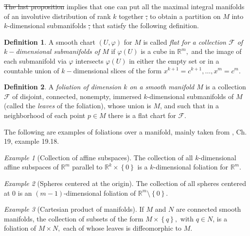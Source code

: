\documentclass[12pt, letterpaper, reqno]{amsart}
\theoremstyle{definition}
\newtheorem{df}{Definition}
\theoremstyle{plain}
\theoremstyle{remark}
\newtheorem{ex}{Example}
\providecommand{\DIFadd}[1]{{\protect\color{blue}\uwave{#1}}} %
\providecommand{\DIFdel}[1]{{\protect\color{red}\sout{#1}}}                      %
\providecommand{\DIFaddbegin}{} %
\providecommand{\DIFaddend}{} %
\providecommand{\DIFdelbegin}{} %
\providecommand{\DIFdelend}{} %
\newcommand{\DIFscaledelfig}{0.5}
\newlength{\DIFdelgraphicswidth} %
\newlength{\DIFdelgraphicsheight} %
\newcommand{\DIFaddincludegraphics}[2][]{{\color{blue}\fbox{\DIFOincludegraphics[#1]{#2}}}} %
\newcommand{\DIFdelincludegraphics}[2][]{%
\sbox{\DIFdelgraphicsbox}{\DIFOincludegraphics[#1]{#2}}%
\settoboxwidth{\DIFdelgraphicswidth}{\DIFdelgraphicsbox} %
\settoboxtotalheight{\DIFdelgraphicsheight}{\DIFdelgraphicsbox} %
\scalebox{\DIFscaledelfig}{%
\parbox[b]{\DIFdelgraphicswidth}{\usebox{\DIFdelgraphicsbox}\\[-\baselineskip] \rule{\DIFdelgraphicswidth}{0em}}\llap{\resizebox{\DIFdelgraphicswidth}{\DIFdelgraphicsheight}{%
\setlength{\unitlength}{\DIFdelgraphicswidth}%
\begin{picture}(1,1)%
\thicklines\linethickness{2pt} %
{\color[rgb]{1,0,0}\put(0,0){\framebox(1,1){}}}%
{\color[rgb]{1,0,0}\put(0,0){\line( 1,1){1}}}%
{\color[rgb]{1,0,0}\put(0,1){\line(1,-1){1}}}%
\end{picture}%
}\hspace*{3pt}}} %
} %
\DeclareRobustCommand{\DIFaddbegin}{\DIFOaddbegin \let\includegraphics\DIFaddincludegraphics} %
\DeclareRobustCommand{\DIFaddend}{\DIFOaddend \let\includegraphics\DIFOincludegraphics} %
\DeclareRobustCommand{\DIFdelbegin}{\DIFOdelbegin \let\includegraphics\DIFdelincludegraphics} %
\DeclareRobustCommand{\DIFdelend}{\DIFOaddend \let\includegraphics\DIFOincludegraphics} %
\begin{document}
\DIFdelbegin \DIFdel{The last proposition }\DIFdelend \DIFaddbegin \DIFadd{Proposition \ref{prop:local_structure} }\DIFaddend implies that one can put all the maximal integral manifolds of an involutive distribution of rank $ k $  together \DIFdelbegin \DIFdel{, }\DIFdelend to obtain a partition on $ M $ into $ k $-dimensional submanifolds \DIFdelbegin \DIFdel{, }\DIFdelend that satisfy the following definition.
\begin{df}
	A smooth chart $ (U,\varphi) $ for $ M $ is called \textit{flat for a collection $ \mathcal{F} $ of $ k- $dimensional submanifolds of $ M $} if $ \varphi(U) $ is a cube in $ \mathbb{R}^m, $ and the image of each submanifold via $ \varphi $ intersects $ \varphi(U) $ in either the empty set or in a countable union of $ k- $dimensional slices of the form $ x^{k+1}=c^{k+1},\dots,x^m=c^m. $   
\end{df}

\begin{df}
	A \textit{foliation of dimension $ k $ on a smooth manifold $ M $} is a collection $ \mathcal{F} $ of disjoint, connected, nonempty, immersed $ k $-dimensional submanifolds of $ M $ (called the \textit{leaves} of the foliation), whose union is $ M $, and such that in a neighborhood of each point $ p\in M $ there is a flat chart for $ \mathcal{F}. $  
\end{df}

The following are examples of foliations over a manifold, mainly taken from \cite{lee2003introduction}, Ch. 19, example 19.18.

\begin{ex}[Collection of affine subspaces]
	The collection of all $ k $-dimensional affine subspaces of $ \mathbb{R}^m $ parallel to $ \mathbb{R}^k\times \left\{ 0 \right\} $ is a $ k $-dimensional foliation for $ \mathbb{R}^m. $ 
\end{ex}

\begin{ex}[Spheres centered at the origin]
	The collection of all spheres centered at $ 0 $ is an $ (m-1) $-dimensional foliation of $ \mathbb{R}^m\setminus \left\{ 0 \right\} $. 
\end{ex}

\begin{ex}[Cartesian product of manifolds]\label{ex:product_foliation}
	If $ M $ and $ N $ are connected smooth manifolds, the collection of subsets of the form $ M\times \left\{ q \right\}, $ with $ q\in N $, is a foliation of $ M\times N, $ each of whose leaves is diffeomorphic to $ M. $  	
\end{ex}
\end{document}
